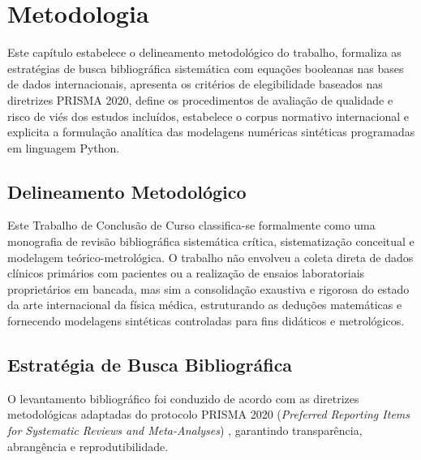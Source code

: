 \documentclass[
  12pt,
  a4paper,
  oneside
]{report}
\begin{document}
\chapter{Metodologia}
\label{chap:metodologia}

Este capítulo estabelece o delineamento metodológico do trabalho, formaliza as estratégias de busca bibliográfica sistemática com equações booleanas nas bases de dados internacionais, apresenta os critérios de elegibilidade baseados nas diretrizes PRISMA 2020, define os procedimentos de avaliação de qualidade e risco de viés dos estudos incluídos, estabelece o corpus normativo internacional e explicita a formulação analítica das modelagens numéricas sintéticas programadas em linguagem Python.

\section{Delineamento Metodológico}
\label{sec:delineamento_classificacao}
Este Trabalho de Conclusão de Curso classifica-se formalmente como uma monografia de revisão bibliográfica sistemática crítica, sistematização conceitual e modelagem teórico-metrológica. O trabalho não envolveu a coleta direta de dados clínicos primários com pacientes ou a realização de ensaios laboratoriais proprietários em bancada, mas sim a consolidação exaustiva e rigorosa do estado da arte internacional da física médica, estruturando as deduções matemáticas e fornecendo modelagens sintéticas controladas para fins didáticos e metrológicos.

\section{Estratégia de Busca Bibliográfica}
\label{sec:estrategia_busca_booleana_detalhada}
O levantamento bibliográfico foi conduzido de acordo com as diretrizes metodológicas adaptadas do protocolo PRISMA 2020 (\emph{Preferred Reporting Items for Systematic Reviews and Meta-Analyses}) \cite{page2021}, garantindo transparência, abrangência e reprodutibilidade.
\end{document}
